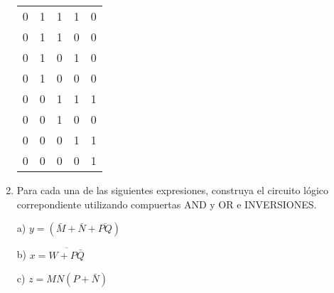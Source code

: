 \documentclass[a4paper, 12pt]{article}
\newcommand{\Aspace}{0.2cm}
\begin{document}
\begin{enumerate}
{\begin{tabular}{c|c|c|c|c}
                    0           &   1           &   1           &   1           &   0                                                                           \\
                    0           &   1           &   1           &   0           &   0                                                                           \\
                    0           &   1           &   0           &   1           &   0                                                                           \\
                    0           &   1           &   0           &   0           &   0                                                                           \\
                    0           &   0           &   1           &   1           &   1                                                                           \\
                    0           &   0           &   1           &   0           &   0                                                                           \\
                    0           &   0           &   0           &   1           &   1                                                                           \\
                    0           &   0           &   0           &   0           &   1                                                                           \\
                \end{tabular} 
            }



        \item Para cada una de las siguientes expresiones, construya el circuito lógico correpondiente utilizando compuertas AND y OR e INVERSIONES.
            \vspace{\Aspace} \par
            a) $y = (\bar{M} + \bar{N} + \overline{PQ})$
            \\ { \color{azul}  }

            \vspace{\Aspace} \par
            b) $x = \overline{W + P\bar{Q}}$
            \\ { \color{azul}  }

            \vspace{\Aspace} \par
            c) $z = MN(P + \bar{N})$
            \\ { \color{azul}  }


\end{enumerate}
\end{document}
